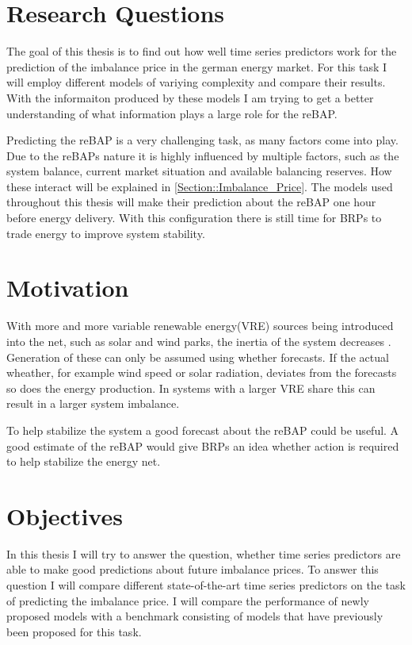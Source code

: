 \documentclass[class=scrbook, crop=false]{standalone}
\begin{document}


\section{Research Questions}
\label{Section::Research_Questions}
The goal of this thesis is to find out how well time series predictors work for the prediction of the imbalance price in the german energy market. 
For this task I will employ different models of variying complexity and compare their results.
With the informaiton produced by these models I am trying to get a better understanding of what information plays a large role for the reBAP.

Predicting the reBAP is a very challenging task, as many factors come into play.
Due to the reBAPs nature it is highly influenced by multiple factors, such as the system balance, current market situation and available balancing reserves. 
How these interact will be explained in \ref{Section::Imbalance_Price}. 
The models used throughout this thesis will make their prediction about the reBAP one hour before energy delivery. 
With this configuration there is still time for BRPs to trade energy to improve system stability. 


\section{Motivation}
\label{Section::Motivation}

With more and more variable renewable energy(VRE) sources being introduced into the net, such as solar and wind parks, the inertia of the system decreases \cite{weitemeyerIntegrationRenewableEnergy2015}. 
Generation of these can only be assumed using whether forecasts. If the actual wheather, for example wind speed or solar radiation, deviates from the forecasts so does the energy production. In systems with a larger VRE share this can result in a larger system imbalance. 

To help stabilize the system a good forecast about the reBAP could be useful. A good estimate of the reBAP would give BRPs an idea whether action is required to help stabilize the energy net.

\section{Objectives}
\label{Section::Objectives}
In this thesis I will try to answer the question, whether time series predictors are able to make good predictions about future imbalance prices. To answer this question I will compare different state-of-the-art time series predictors on the task of predicting the imbalance price. I will compare the performance of newly proposed models with a benchmark consisting of models that have previously been proposed for this task.
\end{document}

